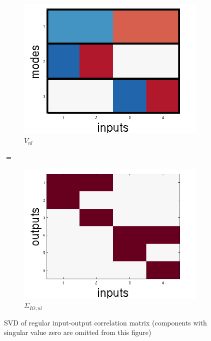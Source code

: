 \documentclass[10pt,letterpaper]{article}
\begin{document}
\begin{figure}
\begin{subfigure}{0.22\textwidth}
\includegraphics[width=\textwidth]{figures/V_nl.png}
\caption{$V_{nl}$}
\end{subfigure}
\huge{$=$}
\begin{subfigure}{0.22\textwidth}
\includegraphics[width=\textwidth]{figures/nonlinear_IO.png}
\caption{$\Sigma_{IO,nl}$}
\end{subfigure}
\caption{SVD of regular input-output correlation matrix (components with singular value zero are omitted from this figure)}
\label{regular_SVD_figure}
\end{figure}
\end{document}
